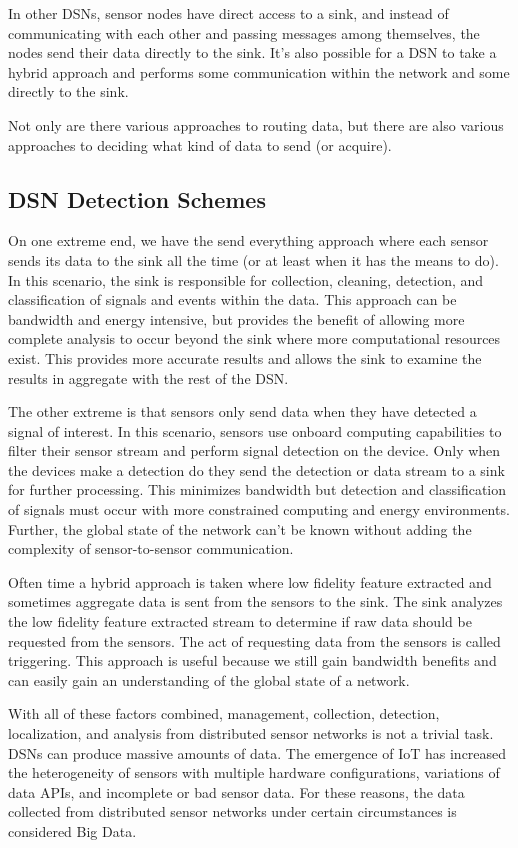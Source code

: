 In other DSNs, sensor nodes have direct access to a sink, and instead of communicating with each other and passing messages among themselves, the nodes send their data directly to the sink. It's also possible for a DSN to take a hybrid approach and performs some communication within the network and some directly to the sink.

Not only are there various approaches to routing data, but there are also various approaches to deciding what kind of data to send (or acquire).

\subsection{DSN Detection Schemes}
On one extreme end, we have the send everything approach where each sensor sends its data to the sink all the time (or at least when it has the means to do). In this scenario, the sink is responsible for collection, cleaning, detection, and classification of signals and events within the data. This approach can be bandwidth and energy intensive, but provides the benefit of allowing more complete analysis to occur beyond the sink where more computational resources exist. This provides more accurate results and allows the sink to examine the results in aggregate with the rest of the DSN.

The other extreme is that sensors only send data when they have detected a signal of interest. In this scenario, sensors use onboard computing capabilities to filter their sensor stream and perform signal detection on the device. Only when the devices make a detection do they send the detection or data stream to a sink for further processing. This minimizes bandwidth but detection and classification of signals must occur with more constrained computing and energy environments. Further, the global state of the network can't be known without adding the complexity of sensor-to-sensor communication.

Often time a hybrid approach is taken where low fidelity feature extracted and sometimes aggregate data is sent from the sensors to the sink. The sink analyzes the low fidelity feature extracted stream to determine if raw data should be requested from the sensors. The act of requesting data from the sensors is called triggering. This approach is useful because we still gain bandwidth benefits and can easily gain an understanding of the global state of a network.

With all of these factors combined, management, collection, detection, localization, and analysis from distributed sensor networks is not a trivial task. DSNs can produce massive amounts of data. The emergence of IoT has increased the heterogeneity of sensors with multiple hardware configurations, variations of data APIs, and incomplete or bad sensor data. For these reasons, the data collected from distributed sensor networks under certain circumstances is considered Big Data.

